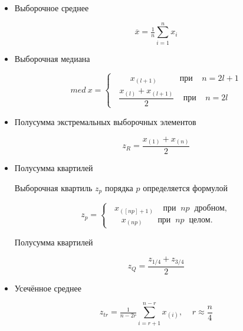 \begin{itemize}
	\item Выборочное среднее
	
	\begin{equation} \label{eq:mean}
		\overline{x} = \tfrac{1}{n}\sum\limits_{i=1}^n x_i
	\end{equation}
	
	\item Выборочная медиана
	
	\begin{equation} \label{eq:med}
		med \: x = 
		\begin{cases} 
			\;\;\;\;\;\;\; x_{(l+1)} \:\;\;\;\;\;\;\;\;\; \text{при} \;\;\;\; n = 2l + 1\\
			\;\; \dfrac{x_{(l)} + x_{(l+1)}}{2} \;\;\;\; \text{при} \;\;\;\; n = 2l
		\end{cases}
	\end{equation}
	
	\item Полусумма экстремальных выборочных элементов
	
	\begin{equation} \label{eq:zR}
		z_R = \dfrac{x_{(1)} + x_{(n)}}{2}
	\end{equation}
	
	\item Полусумма квартилей
	
	Выборочная квартиль $z_p$ порядка $p$ определяется формулой
	
	\begin{equation}
		z_p =
		\begin{cases}
			\;\; x_{([np]+1)} \;\;\;\; \text{при} \;\; np \;\; \text{дробном},\\
			\;\;\;\;\; x_{(np)} \,\:\;\;\;\;\; \text{при} \;\; np \;\; \text{целом}.
		\end{cases}
	\end{equation}
	
	Полусумма квартилей
	
	\begin{equation} \label{eq:zQ}
		z_Q = \dfrac{z_{1/4} + z_{3/4}}{2}
	\end{equation}
	
	\item Усечённое среднее
	
	\begin{equation} \label{eq:zTr}
		z_{tr} = \tfrac{1}{n-2r}\sum\limits_{i=r+1}^{n-r} x_{(i)}, \;\;\;\; r \approx \dfrac{n}{4}
	\end{equation}
	
\end{itemize}

